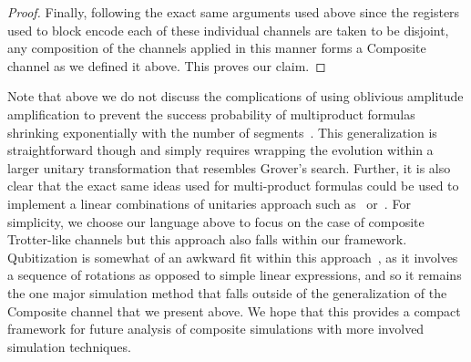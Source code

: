 \begin{proof}
Finally, following the exact same arguments used above since the registers used to block encode each of these individual channels are taken to be disjoint, any composition of the channels applied in this manner forms a Composite channel as we defined it above.  This proves our claim.
\end{proof}
Note that above we do not discuss the complications of using oblivious amplitude amplification to prevent the success probability of multiproduct formulas shrinking exponentially with the number of segments~\cite{berry2015hamiltonian}.  This generalization is straightforward though and simply requires wrapping the evolution within a larger unitary transformation that resembles Grover's search.  Further, it is also clear that the exact same ideas used for multi-product formulas could be used to implement a linear combinations of unitaries approach such as~\cite{berry2015simulating} or~\cite{low2019hamiltonian}.  For simplicity, we choose our language above to focus on the case of composite Trotter-like channels but this approach also falls within our framework. \cite{Chen_2021} Qubitization is somewhat of an awkward fit within this approach~\cite{low2018hamiltonian}, as it involves a sequence of rotations as opposed to simple linear expressions, and so it remains the one major simulation method that falls outside of the generalization of the Composite channel that we present above. We hope that this provides a compact framework for future analysis of composite simulations with more involved simulation techniques.

